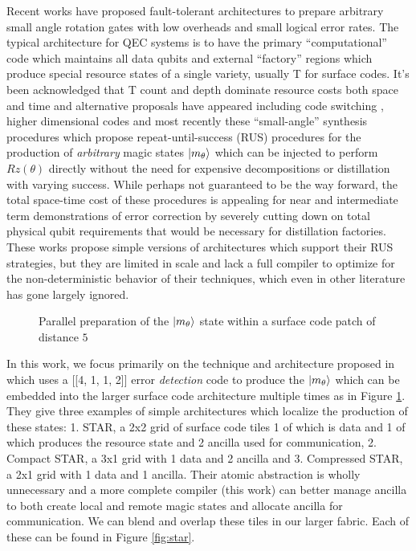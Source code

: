 Recent works \cite{akahoshi2023partially, ding2018magic} have proposed fault-tolerant architectures to prepare arbitrary small angle rotation gates with low overheads and small logical error rates. The typical architecture for QEC systems is to have the primary ``computational'' code which maintains all data qubits and external ``factory'' regions which produce special resource states of a single variety, usually T for surface codes. It's been acknowledged that T count and depth dominate resource costs both space and time \cite{litinski2019magic} and alternative proposals have appeared including code switching \cite{anderson2014fault}, higher dimensional codes \cite{kubica2018abcs} and most recently these ``small-angle'' synthesis procedures \cite{akahoshi2023partially, ding2018magic} which propose repeat-until-success (RUS) procedures for the production of \textit{arbitrary} magic states $\ket{m_\theta}$ which can be injected to perform $Rz(\theta)$ directly without the need for expensive decompositions or distillation with varying success. While perhaps not guaranteed to be the way forward, the total space-time cost of these procedures is appealing for near and intermediate term demonstrations of error correction by severely cutting down on total physical qubit requirements that would be necessary for distillation factories. These works propose simple versions of architectures which support their RUS strategies, but they are limited in scale and lack a full compiler to optimize for the non-deterministic behavior of their techniques, which even in other literature has gone largely ignored.

\begin{figure}
    \centering
    
    \caption{Parallel preparation of the $\ket{m_\theta}$ state within a surface code patch of distance $5$}
    \label{fig:parallel_prepare}
\end{figure}
In this work, we focus primarily on the technique and architecture proposed in \cite{akahoshi2023partially} which uses a [[4, 1, 1, 2]] error \textit{detection} code to produce the $\ket{m_\theta}$ which can be embedded into the larger surface code architecture multiple times as in Figure \ref{fig:parallel_prepare}. They give three examples of simple architectures which localize the production of these states: 1. STAR, a 2x2 grid of surface code tiles 1 of which is data and 1 of which produces the resource state and 2 ancilla used for communication, 2. Compact STAR, a 3x1 grid with 1 data and 2 ancilla and 3. Compressed STAR, a 2x1 grid with 1 data and 1 ancilla. Their atomic abstraction is wholly unnecessary and a more complete compiler (this work) can better manage ancilla to both create local and remote magic states and allocate ancilla for communication. We can blend and overlap these tiles in our larger fabric. Each of these can be found in Figure \ref{fig:star}.





